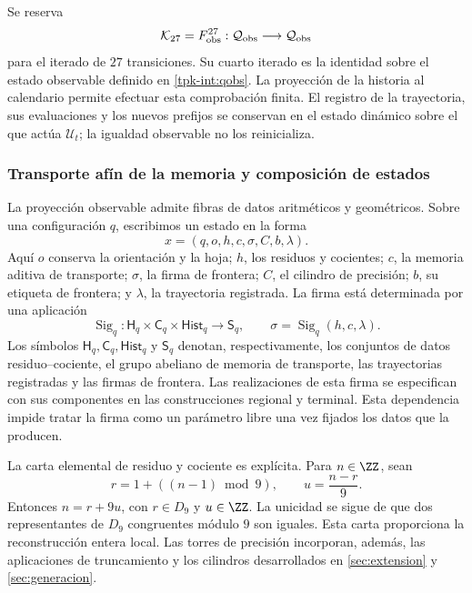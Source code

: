 Se reserva
\[
 \mathcal K_{27}=F_{\rm obs}^{27}:
 \mathcal Q_{\rm obs}\longrightarrow\mathcal Q_{\rm obs}
\]
para el iterado de \(27\) transiciones. Su cuarto iterado es la
identidad sobre el estado observable definido en \eqref{tpk-int:qobs}.
La proyección de la historia al calendario permite efectuar esta
comprobación finita. El registro de la trayectoria, sus evaluaciones y
los nuevos prefijos se conservan en el estado dinámico sobre el que
actúa \(\mathcal U_t\); la igualdad observable no los reinicializa.

\subsubsection{Transporte afín de la memoria y composición de estados}
\label{tpk-int:memoria}

La proyección observable admite fibras de datos aritméticos y geométricos.
Sobre una configuración \(q\), escribimos un estado en la forma
\[
 x=(q,o,h,c,\sigma,C,b,\lambda).
\]
Aquí \(o\) conserva la orientación y la hoja; \(h\), los residuos
y cocientes; \(c\), la memoria aditiva de transporte; \(\sigma\),
la firma de frontera; \(C\), el cilindro de precisión; \(b\), su
etiqueta de frontera; y \(\lambda\), la trayectoria registrada. La
firma está determinada por una aplicación
\[
 \operatorname{Sig}_q:
 \mathsf H_q\times\mathsf C_q\times\mathsf{Hist}_q
 \longrightarrow\mathsf S_q,
 \qquad \sigma=\operatorname{Sig}_q(h,c,\lambda).
\]
Los símbolos \(\mathsf H_q,\mathsf C_q,\mathsf{Hist}_q\) y
\(\mathsf S_q\) denotan, respectivamente, los conjuntos de datos
residuo--cociente, el grupo abeliano de memoria de transporte, las
trayectorias registradas y las firmas de frontera.
Las realizaciones de esta firma se especifican con sus componentes en
las construcciones regional y terminal. Esta dependencia impide tratar
la firma como un parámetro libre una vez fijados los datos que la producen.

La carta elemental de residuo y cociente es explícita. Para
\(n\in\ZZ\), sean
\[
 r=1+((n-1)\bmod9),\qquad u=\frac{n-r}{9}.
\]
Entonces \(n=r+9u\), con \(r\in D_9\) y \(u\in\ZZ\).
La unicidad se sigue de que dos representantes de \(D_9\) congruentes
módulo \(9\) son iguales. Esta carta proporciona la reconstrucción
entera local. Las torres de precisión incorporan, además, las aplicaciones
de truncamiento y los cilindros desarrollados en
\ref{sec:extension} y \ref{sec:generacion}.

